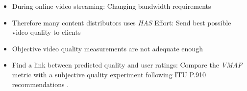 \begin{itemize}
	\item During online video streaming:
	\newline Changing bandwidth requirements
	\item Therefore many content distributors uses \textit{HAS} \cite{seufert:2015:hassurvey}
	\newline Effort: Send best possible video quality to clients 
	\item Objective video quality measurements are not adequate enough
	\item Find a link between predicted quality and user ratings:
	\newline Compare the \textit{VMAF} metric \cite{lin2013:mmf,lin2014:fvqa} with a subjective quality experiment following ITU P.910 recommendations \cite{rec1998p}.
\end{itemize}